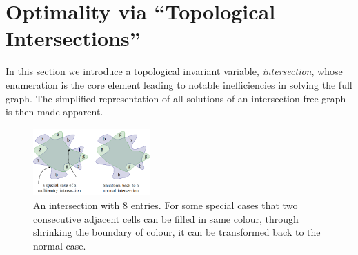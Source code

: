 \documentclass[conference]{IEEEtran}
\begin{document}
\section{Optimality via ``Topological Intersections''}
\label{section_intersection}
In this section we introduce a topological invariant variable, \textit{intersection}, whose enumeration is the core element leading to notable inefficiencies in solving the full graph. The simplified representation of all solutions of an intersection-free graph is then made apparent.  


\begin{figure}[t]
\centering
\includegraphics[width = 0.4\textwidth]{figures/multi_entry}
\caption{An intersection with $8$ entries. For some special cases that two consecutive adjacent cells can be filled in same colour, through shrinking the boundary of colour, it can be transformed back to the normal case. }\label{fig:multi_entry}
\end{figure}
\end{document}
